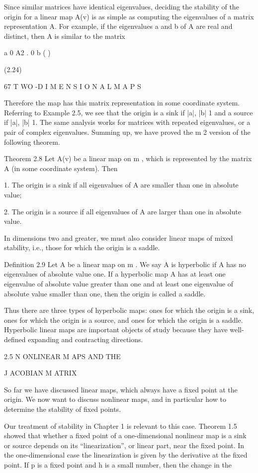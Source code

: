 \documentclass[12pt]{article}
\begin{document}
Since similar matrices have identical eigenvalues, deciding the stability of the origin for a linear map A(v) is as simple as 
computing the eigenvalues of a matrix representation A. For example, if the eigenvalues a and b of A are real and distinct, then A is 
similar to the matrix

a 0 A2  . 0 b ( )

(2.24)

67 T WO -D I M E N S I O N A L M A P S

Therefore the map has this matrix representation in some coordinate system. Referring to Example 2.5, we see that the origin is a 
sink if |a|, |b|  1 and a source if |a|, |b|  1. The same analysis works for matrices with repeated eigenvalues, or a pair of complex 
eigenvalues. Summing up, we have proved the m  2 version of the following theorem.

Theorem 2.8 Let A(v) be a linear map on  m , which is represented by the matrix A (in some coordinate system). Then

1. The origin is a sink if all eigenvalues of A are smaller than one in absolute value;

2. The origin is a source if all eigenvalues of A are larger than one in absolute value.

In dimensions two and greater, we must also consider linear maps of mixed stability, i.e., those for which the origin is a saddle.

Deﬁnition 2.9 Let A be a linear map on  m . We say A is hyperbolic if A has no eigenvalues of absolute value one. If a hyperbolic 
map A has at least one eigenvalue of absolute value greater than one and at least one eigenvalue of absolute value smaller than one, 
then the origin is called a saddle.

Thus there are three types of hyperbolic maps: ones for which the origin is a sink, ones for which the origin is a source, and ones 
for which the origin is a saddle. Hyperbolic linear maps are important objects of study because they have well-deﬁned expanding and 
contracting directions.

2.5 N ONLINEAR M APS AND THE

J ACOBIAN M ATRIX

So far we have discussed linear maps, which always have a ﬁxed point at the origin. We now want to discuss nonlinear maps, and in 
particular how to determine the stability of ﬁxed points.

Our treatment of stability in Chapter 1 is relevant to this case. Theorem 1.5 showed that whether a ﬁxed point of a one-dimensional 
nonlinear map is a sink or source depends on its “linearization”, or linear part, near the ﬁxed point. In the one-dimensional case 
the linearization is given by the derivative at the ﬁxed point. If p is a ﬁxed point and h is a small number, then the change in 
the
\end{document}
